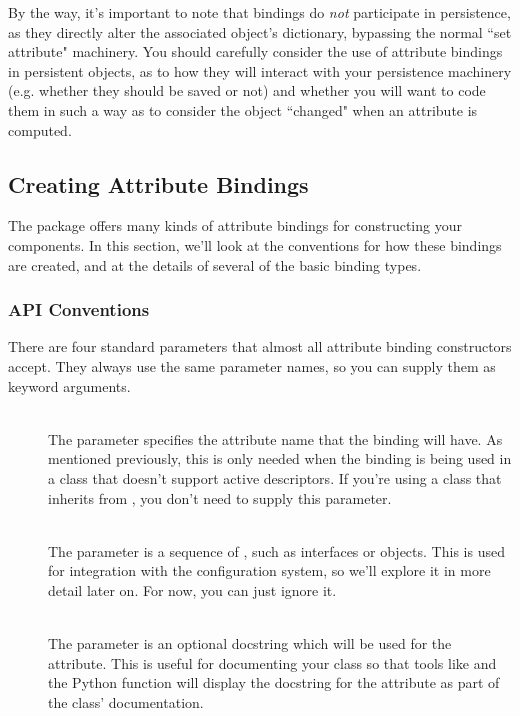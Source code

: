 \begin{verbatim%
}
\begin{verbatim%
}
\begin{verbatim%
}
\begin{verbatim%
}
\begin{verbatim%
}
\begin{verbatim%
}
\begin{verbatim%
}
\begin{verbatim%
}
\begin{verbatim%
}
By the way, it's important to note that bindings do \emph{not} participate in
persistence, as they directly alter the associated object's dictionary,
bypassing the normal ``set attribute" machinery.  You should carefully
consider the use of attribute bindings in persistent objects, as to how they
will interact with your persistence machinery (e.g. whether they should be
saved or not) and whether you will want to code them in such a way as to
consider the object ``changed" when an attribute is computed.




\subsection{Creating Attribute Bindings}

The  package offers many kinds of attribute bindings for
constructing your components.  In this section, we'll look at the conventions
for how these bindings are created, and at the details of several of the basic
binding types.

\subsubsection{API Conventions}

There are four standard parameters that almost all attribute binding
constructors accept.  They always use the same parameter names, so you can
supply them as keyword arguments.

\begin{description}

\item[] \hfill \\
The  parameter specifies the attribute name that the binding will
have.  As mentioned previously, this is only needed when the binding is being
used in a class that doesn't support active descriptors.  If you're using
a class that inherits from , you don't need to supply
this parameter.

\item[] \hfill \\
The  parameter is a sequence of
, such as interfaces or 
objects.  This is used for integration with the configuration system, so we'll
explore it in more detail later on.  For now, you can just ignore it.

\item[] \hfill \\
The  parameter is an optional docstring which will be used for the
attribute.  This is useful for documenting your class so that tools like
 and the Python  function will display the
docstring for the attribute as part of the class' documentation.


\end{description}
\end{verbatim%
}
\end{verbatim%
}
\end{verbatim%
}
\end{verbatim%
}
\end{verbatim%
}
\end{verbatim%
}
\end{verbatim%
}
\end{verbatim%
}
\end{verbatim%
}
